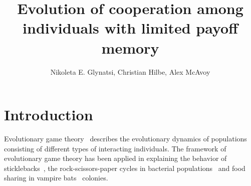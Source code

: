 \documentclass[11pt]{article}
\title{\bf  \sffamily \LARGE Evolution of cooperation among individuals with
limited payoff memory\\}
\date{}
\author{Nikoleta E. Glynatsi, Christian Hilbe, Alex McAvoy}
\theoremstyle{plainCl1}
\theoremstyle{plainCl2}
\begin{document}
\maketitle

\begin{abstract}

\end{abstract}

\section{Introduction}

Evolutionary game theory~\cite{smith1982evolution, hofbauer1998evolutionary,
nowak2004evolutionary, hauert2005game} describes the evolutionary dynamics of
populations consisting of different types of interacting individuals. The
framework of evolutionary game theory has been applied in explaining the
behavior of sticklebacks~\cite{milinski1987tit}, the rock-scissors-paper cycles
in bacterial populations~\cite{kerr2002local} and food sharing in vampire
bats~\cite{carter2020development} colonies.
\end{document}
